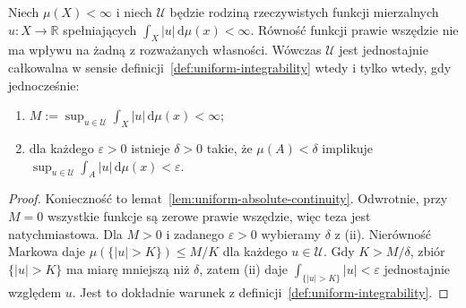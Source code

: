 \begin{twierdzenie}
\label{thm:ui-two-criteria-8}
Niech $\mu(X)<\infty$ i niech $\mathcal U$ będzie
rodziną rzeczywistych funkcji mierzalnych $u:X\to\mathbb R$
spełniających $\int_X|u|\,\mathrm d\mu(x)<\infty$.
Równość funkcji prawie wszędzie nie ma wpływu
na żadną z rozważanych własności.
Wówczas $\mathcal U$ jest jednostajnie całkowalna
w sensie definicji~\ref{def:uniform-integrability}
wtedy i tylko wtedy, gdy jednocześnie:
\begin{enumerate}[label=\textup{(\roman*)}]
\item $M:=\sup_{u\in\mathcal U}\int_X|u|\,\mathrm d\mu(x)<\infty$;
\item dla każdego $\varepsilon>0$ istnieje $\delta>0$
takie, że $\mu(A)<\delta$ implikuje
$\sup_{u\in\mathcal U}\int_A|u|\,\mathrm d\mu(x)<\varepsilon$.
\end{enumerate}
\end{twierdzenie}
\begin{proof}
Konieczność to lemat~\ref{lem:uniform-absolute-continuity}.
Odwrotnie, przy $M=0$ wszystkie funkcje są zerowe
prawie wszędzie, więc teza jest natychmiastowa.
Dla $M>0$ i zadanego $\varepsilon>0$ wybieramy
$\delta$ z (ii). Nierówność Markowa daje
$\mu(\{|u|>K\})\le M/K$ dla każdego $u\in\mathcal U$.
Gdy $K>M/\delta$, zbiór $\{|u|>K\}$ ma miarę
mniejszą niż $\delta$, zatem (ii) daje
$\int_{\{|u|>K\}}|u|<\varepsilon$ jednostajnie
względem $u$. Jest to dokładnie warunek z
definicji~\ref{def:uniform-integrability}.
\end{proof}

